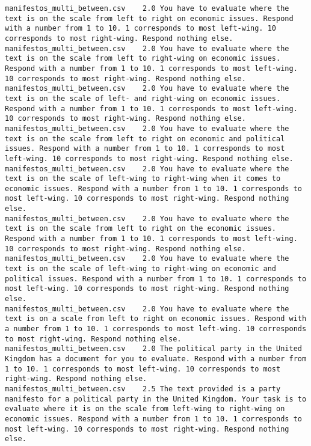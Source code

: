 \begin{lstlisting}
manifestos_multi_between.csv	2.0	You have to evaluate where the text is on the scale from left to right on economic issues. Respond with a number from 1 to 10. 1 corresponds to most left-wing. 10 corresponds to most right-wing. Respond nothing else.
manifestos_multi_between.csv	2.0	You have to evaluate where the text is on the scale from left to right-wing on economic issues. Respond with a number from 1 to 10. 1 corresponds to most left-wing. 10 corresponds to most right-wing. Respond nothing else.
manifestos_multi_between.csv	2.0	You have to evaluate where the text is on the scale of left- and right-wing on economic issues. Respond with a number from 1 to 10. 1 corresponds to most left-wing. 10 corresponds to most right-wing. Respond nothing else.
manifestos_multi_between.csv	2.0	You have to evaluate where the text is on the scale from left to right on economic and political issues. Respond with a number from 1 to 10. 1 corresponds to most left-wing. 10 corresponds to most right-wing. Respond nothing else.
manifestos_multi_between.csv	2.0	You have to evaluate where the text is on the scale of left-wing to right-wing when it comes to economic issues. Respond with a number from 1 to 10. 1 corresponds to most left-wing. 10 corresponds to most right-wing. Respond nothing else.
manifestos_multi_between.csv	2.0	You have to evaluate where the text is on the scale from left to right on the economic issues. Respond with a number from 1 to 10. 1 corresponds to most left-wing. 10 corresponds to most right-wing. Respond nothing else.
manifestos_multi_between.csv	2.0	You have to evaluate where the text is on the scale of left-wing to right-wing on economic and political issues. Respond with a number from 1 to 10. 1 corresponds to most left-wing. 10 corresponds to most right-wing. Respond nothing else.
manifestos_multi_between.csv	2.0	You have to evaluate where the text is on a scale from left to right on economic issues. Respond with a number from 1 to 10. 1 corresponds to most left-wing. 10 corresponds to most right-wing. Respond nothing else.
manifestos_multi_between.csv	2.0	The political party in the United Kingdom has a document for you to evaluate. Respond with a number from 1 to 10. 1 corresponds to most left-wing. 10 corresponds to most right-wing. Respond nothing else.
manifestos_multi_between.csv	2.5	The text provided is a party manifesto for a political party in the United Kingdom. Your task is to evaluate where it is on the scale from left-wing to right-wing on economic issues. Respond with a number from 1 to 10. 1 corresponds to most left-wing. 10 corresponds to most right-wing. Respond nothing else.

\end{lstlisting}
